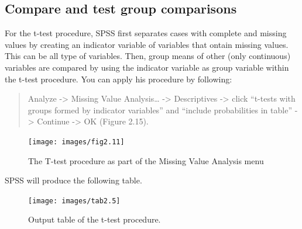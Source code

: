 \documentclass[
]{book}
\begin{document}
\hypertarget{compare-and-test-group-comparisons}{%
\subsection{Compare and test group comparisons}\label{compare-and-test-group-comparisons}}

For the t-test procedure, SPSS first separates cases with complete and missing values by creating an indicator variable of variables that ontain missing values. This can be all type of variables. Then, group means of other (only continuous) variables are compared by using the indicator variable as group variable within the t-test procedure. You can apply his procedure by following:

\begin{quote}
Analyze -\textgreater{} Missing Value Analysis\ldots{} -\textgreater{} Descriptives -\textgreater{} click ``t-tests with groups formed by indicator variables'' and ``include probabilities in table'' -\textgreater{} Continue -\textgreater{} OK (Figure 2.15).
\end{quote}

\begin{figure}

{\centering \texttt{[image: images/fig2.11]} 

}

\caption{The T-test procedure as part of the Missing Value Analysis menu}\label{fig:fig2-11}
\end{figure}

SPSS will produce the following table.

\begin{figure}

{\centering \texttt{[image: images/tab2.5]} 

}

\caption{Output table of the t-test procedure.}\label{fig:tab2-5}
\end{figure}
\end{document}

